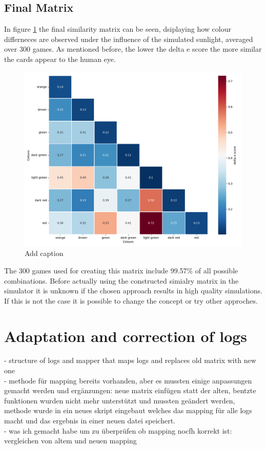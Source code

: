 \subsection{Final Matrix}
In figure \ref{fig:simMatrix} the final similarity matrix can be seen, dsiplaying how colour differneces are observed under the influence of the simulated sunlight, averaged over 300 games. As mentioned before, the lower the delta e score the more similar the cards appear to the human eye. 
\begin{figure}[H]
	\centering
	\includegraphics[width=15cm]{images/simMatrix.png}
	\caption[Bild kurz]{Add caption}
	\label{fig:simMatrix}
\end{figure}
The 300 games used for creating this matrix include 99.57\% of all possible combinations. Before actually using the constructed simialry matrix in the simulator it is unknown if the chosen approach results in high quality simulations. If this is not the case it is possible to change the concept or try other approches. 

\section{Adaptation and correction of logs}
- structure of logs and mapper that maps logs and replaces old matrix with new one\\
- methode für mapping bereits vorhanden, aber es mussten einige anpassungen gemacht werden und ergänzungen: neue matrix einfügen statt der alten, bentzte funktionen wurden nicht mehr unterstützt und mussten geändert werden, methode wurde in ein neues skript eingebaut welches das mapping für alle logs macht und das ergebnis in einer neuen datei speichert.\\
- was ich gemacht habe um zu überprüfen ob mapping nocfh korrekt ist: vergleichen von altem und neuen mapping 


